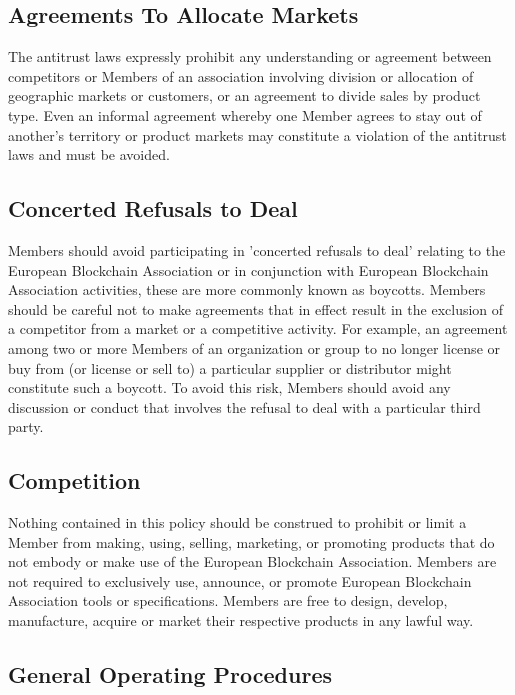 \documentclass{article}
\begin{document}
\subsection{Agreements To Allocate Markets}

The antitrust laws expressly prohibit any understanding or agreement between competitors or Members of an association involving division or allocation of geographic markets or customers, or an agreement to divide sales by product type.
 Even an informal agreement whereby one Member agrees to stay out of another's territory or product markets may constitute a violation of the antitrust laws and must be avoided.

\subsection{Concerted Refusals to Deal}

Members should avoid participating in 'concerted refusals to deal' relating to the European Blockchain Association or in conjunction with European Blockchain Association activities, these are more commonly known as boycotts. 
Members should be careful not to make agreements that in effect result in the exclusion of a competitor from a market or a competitive activity. 
For example, an agreement among two or more Members of an organization or group to no longer license or buy from (or license or sell to) a particular supplier or distributor might constitute such a boycott. 
To avoid this risk, Members should avoid any discussion or conduct that involves the refusal to deal with a particular third party.

\subsection{Competition}

Nothing contained in this policy should be construed to prohibit or limit a Member from making, using, selling, marketing, or promoting products that do not embody or make use of the European Blockchain Association. 
Members are not required to exclusively use, announce, or promote European Blockchain Association tools or specifications. 
Members are free to design, develop, manufacture, acquire or market their respective products in any lawful way.

\subsection{General Operating Procedures}
\end{document}
